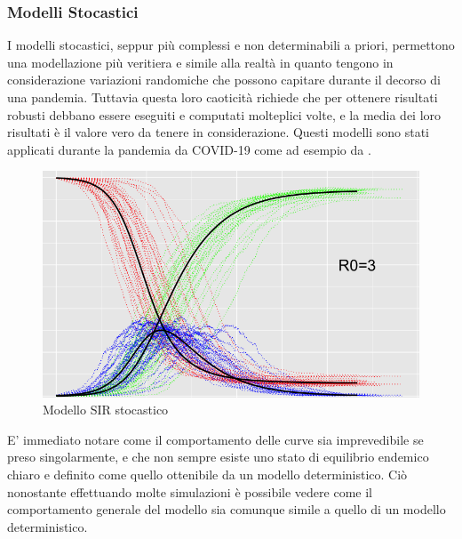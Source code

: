 \subsubsection{Modelli Stocastici}
I modelli stocastici, seppur più complessi e non determinabili 
a priori, permettono una modellazione più veritiera e 
simile alla realtà in quanto tengono in considerazione 
variazioni randomiche che possono capitare durante il 
decorso di una pandemia. Tuttavia questa loro caoticità 
richiede che per ottenere risultati robusti debbano essere 
eseguiti e computati molteplici volte, e la media dei loro 
risultati è il valore vero da tenere in considerazione. 
Questi modelli sono stati applicati durante la pandemia da COVID-19 
come ad esempio da \cite{ijerph17103535}. 

\begin{figure}[h]
    \begin{center}
        \includegraphics[width=\linewidth]{img/Gillespie-e1643395123662.png}
        \caption{Modello SIR stocastico}
        \label{fig:Endemic_equilibrium_stochastic_sir}
    \end{center}
\end{figure}

E' immediato notare come il comportamento delle curve sia 
imprevedibile se preso singolarmente, e che non sempre 
esiste uno stato di equilibrio endemico chiaro e definito come
quello ottenibile da un modello deterministico. Ciò nonostante 
effettuando molte simulazioni è possibile vedere come il 
comportamento generale del modello sia comunque simile a 
quello di un modello deterministico.